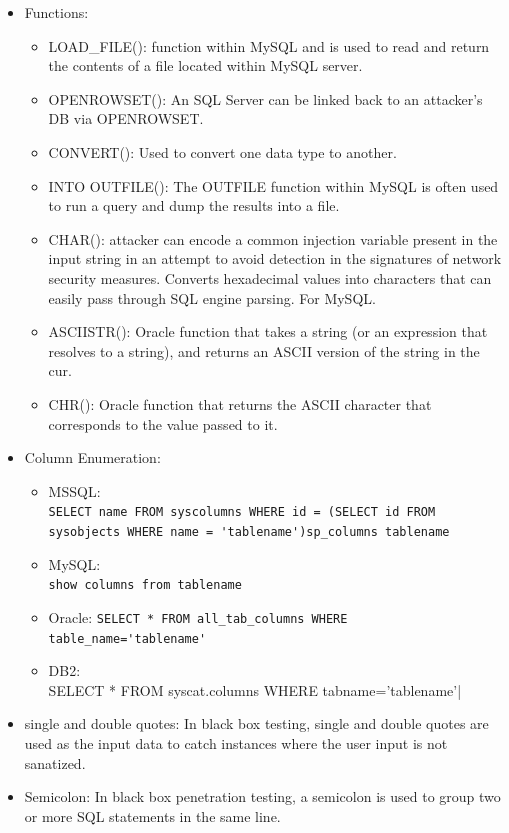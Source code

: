 \begin{itemize}
\begin{itemize}
    \end{itemize}
    \item Functions:
    \begin{itemize}
        \item LOAD\_FILE(): function within MySQL and is used to read and return the contents of a file located within MySQL server.
        \item OPENROWSET(): An SQL Server can be linked back to an attacker's DB via OPENROWSET.
        \item CONVERT(): Used to convert one data type to another.
        \item INTO OUTFILE(): The OUTFILE function within MySQL is often used to run a query and dump the results into a file.
        \item CHAR(): attacker can encode a common injection variable present in the input string in an attempt to avoid detection in the signatures of network security measures. Converts hexadecimal values into characters that can easily pass through SQL engine parsing. For MySQL.
        \item ASCIISTR(): Oracle function that takes a string (or an expression that resolves to a string), and returns an ASCII version of the string in the cur.
        \item CHR(): Oracle function that returns the ASCII character that corresponds to the value passed to it.
    \end{itemize}
    \item Column Enumeration:
    \begin{itemize}
        \item MSSQL:\\
        \verb|SELECT name FROM syscolumns WHERE id = (SELECT id FROM sysobjects WHERE name = 'tablename')sp_columns tablename|
        \item MySQL:\\
        \verb|show columns from tablename|
        \item Oracle:
        \verb|SELECT * FROM all_tab_columns WHERE table_name='tablename'|
        \item DB2:\\
        SELECT * FROM syscat.columns WHERE tabname='tablename'|
    \end{itemize}
    \item single and double quotes: In black box testing, single and double quotes are used as the input data to catch instances where the user input is not sanatized.
    \item Semicolon: In black box penetration testing, a semicolon is used to group two or more SQL statements in the same line.

\end{itemize}
